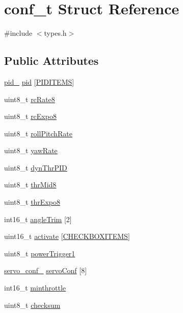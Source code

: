 \hypertarget{structconf__t}{\section{conf\-\_\-t Struct Reference}
\label{structconf__t}
}


{\ttfamily \#include $<$types.\-h$>$}

\subsection*{Public Attributes}
\begin{DoxyCompactItemize}
\item 
\hyperlink{structpid__}{pid\-\_\-} \hyperlink{structconf__t_a5b8b9ea37a24902ea3d14c568b87b697}{pid} \mbox{[}\hyperlink{Uno__MultiWii__HardwarePlatform__Test_2types_8h_ac47ca0713353d3fc9435a4f208f6b9a3a5b01cce209659cf60a5b3464c9f2c3f6}{P\-I\-D\-I\-T\-E\-M\-S}\mbox{]}
\item 
uint8\-\_\-t \hyperlink{structconf__t_a729d503f293f1c992f48af2cff496201}{rc\-Rate8}
\item 
uint8\-\_\-t \hyperlink{structconf__t_a382b8e01b181ab2758fad613c4b7fbf8}{rc\-Expo8}
\item 
uint8\-\_\-t \hyperlink{structconf__t_a1b30852fb8b64e453bd1014196272e41}{roll\-Pitch\-Rate}
\item 
uint8\-\_\-t \hyperlink{structconf__t_ad1f6c9b09743466429c50f9fe37ca94c}{yaw\-Rate}
\item 
uint8\-\_\-t \hyperlink{structconf__t_a47cb9553b60e167b09e7665b146c28db}{dyn\-Thr\-P\-I\-D}
\item 
uint8\-\_\-t \hyperlink{structconf__t_a169d65d8c1acd6c71f0da3491199a046}{thr\-Mid8}
\item 
uint8\-\_\-t \hyperlink{structconf__t_ab7eb566eb3ac052eddb47db1327d4359}{thr\-Expo8}
\item 
int16\-\_\-t \hyperlink{structconf__t_ab122cdccc1b9b801849f925be1680054}{angle\-Trim} \mbox{[}2\mbox{]}
\item 
uint16\-\_\-t \hyperlink{structconf__t_a1442ab81807251b8fe263a6facf11ddb}{activate} \mbox{[}\hyperlink{Uno__MultiWii__HardwarePlatform__Test_2types_8h_a4485d04ca451246b6a81dd2799f83906ac581ba11d0375e47447fa2bbf22f570f}{C\-H\-E\-C\-K\-B\-O\-X\-I\-T\-E\-M\-S}\mbox{]}
\item 
uint8\-\_\-t \hyperlink{structconf__t_aa09f9c422c9a09d30dda6fe642f52918}{power\-Trigger1}
\item 
\hyperlink{structservo__conf__}{servo\-\_\-conf\-\_\-} \hyperlink{structconf__t_a34f0731ed86e0e324a4f8fa7459f9008}{servo\-Conf} \mbox{[}8\mbox{]}
\item 
int16\-\_\-t \hyperlink{structconf__t_a38afc04bc65eb117eb45c9bc0c46d3c5}{minthrottle}
\item 
uint8\-\_\-t \hyperlink{structconf__t_a9d2871d7decd958de75b19a372955045}{checksum}
\end{DoxyCompactItemize}


